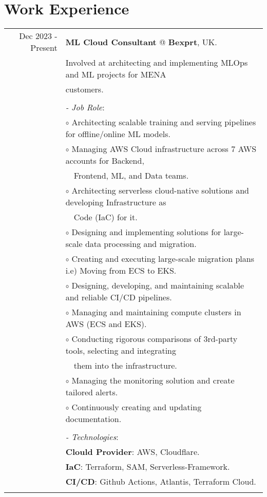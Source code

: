\documentclass[a4paper,10pt]{article}
\begin{document}
\section{\textbf{Work Experience}}
\begin{longtable}{r|l}
    Dec 2023 - Present& \textbf{ML Cloud Consultant} @
    \textbf{Bexprt}, UK. \\&
    Involved at architecting and implementing MLOps and ML projects for MENA \\& customers. \\&
    \\&
    \textit{- Job Role}:\\&
    $\circ$ Architecting scalable training and serving pipelines for offline/online ML models. \\&
    $\circ$ Managing AWS Cloud infrastructure across 7 AWS accounts for Backend,\\&~~Frontend, ML, and Data teams. \\&
    $\circ$ Architecting serverless cloud-native solutions and developing Infrastructure as \\&~~Code (IaC) for it. \\&
    $\circ$ Designing and implementing solutions for large-scale data processing and migration. \\&
    $\circ$ Creating and executing large-scale migration plans i.e) Moving from ECS to EKS. \\&
    $\circ$ Designing, developing, and maintaining scalable and reliable CI/CD pipelines. \\&
    $\circ$ Managing and maintaining compute clusters in AWS (ECS and EKS). \\&
    $\circ$ Conducting rigorous comparisons of 3rd-party tools, selecting and integrating \\& ~~them into the infrastructure. \\&
    $\circ$ Managing the monitoring solution and create tailored alerts. \\&
    $\circ$ Continuously creating and updating documentation. \\&
    \\&
    \textit{- Technologies}:\\&
    \textbf{Clould Provider}: AWS, Cloudflare. \\&
    \textbf{IaC}: Terraform, SAM, Serverless-Framework. \\&
    \textbf{CI/CD}: Github Actions, Atlantis, Terraform Cloud. \\&

\end{longtable}
\end{document}
